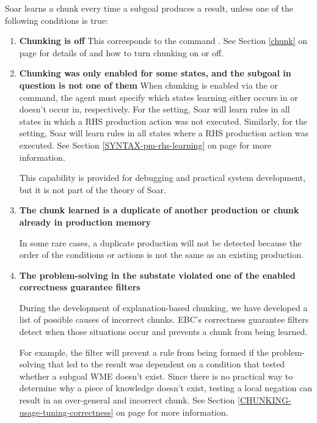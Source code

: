 Soar learns a chunk every time a subgoal produces a result, unless one of the following conditions is true:

\begin{enumerate}
	\item \textbf{Chunking is off} \newline
	This corresponds to the command .  See Section \ref{chunk} on page \pageref{chunk} for details of  and how to turn chunking on or off.

	\item \textbf{Chunking was only enabled for some states, and the subgoal in question is not one of them} \newline
	When chunking is enabled via the  or  command, the agent must specify which states learning either occurs in or doesn't occur in, respectively.  For the  setting, Soar will learn rules in all states in which a  RHS production action was not executed.  Similarly, for the  setting, Soar will learn rules in all states where a  RHS production action was executed.  See Section \ref{SYNTAX-pm-rhs-learning} on page \pageref{SYNTAX-pm-rhs-learning} for more information.

	This capability is provided for debugging and practical system development, but it is not part of the theory of Soar.

	\item \textbf{The chunk learned is a duplicate of another production or chunk already in production memory} \newline

	In some rare cases, a duplicate production will not be detected because the order of the conditions or actions is not the same as an existing production.

	\item \textbf{The problem-solving in the substate violated one of the enabled correctness guarantee filters}

	During the development of explanation-based chunking, we have developed a list of possible causes of incorrect chunks. EBC's correctness guarantee filters detect when those situations occur and prevents a chunk from being learned.  

	For example, the  filter will prevent a rule from being formed if the problem-solving that led to the result was dependent on a condition that tested whether a subgoal WME doesn't exist.  Since there is no practical way to determine why a piece of knowledge doesn't exist, testing a local negation can result in an over-general and incorrect chunk.  See Section \ref{CHUNKING-usage-tuning-correctness} on page \pageref{CHUNKING-usage-tuning-correctness} for more information. 


\end{enumerate}

